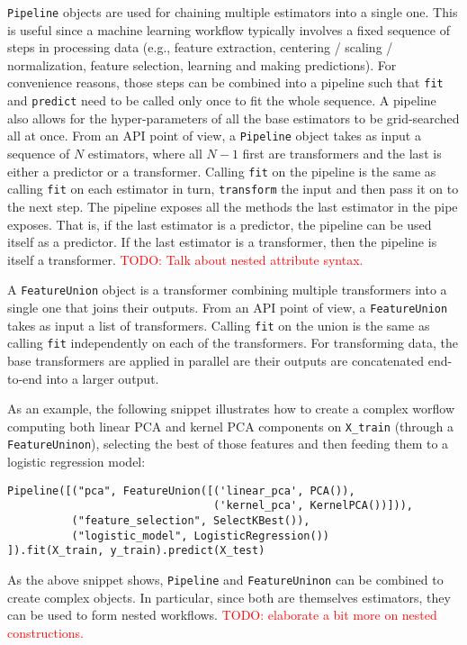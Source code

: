 \documentclass{llncs}
\begin{document}
\texttt{Pipeline} objects are used for chaining multiple estimators into a
single one. This is useful since a machine learning workflow typically involves
a fixed sequence of steps in processing data (e.g., feature extraction,
centering / scaling / normalization, feature selection, learning and making
predictions). For convenience reasons, those steps can be combined into a
pipeline such that \texttt{fit} and \texttt{predict} need to be called only once
to fit the whole sequence. A pipeline also allows for the hyper-parameters of
all the base estimators to be grid-searched all at once. From an API point of
view, a \texttt{Pipeline} object takes as input a sequence of $N$ estimators,
where all $N-1$ first are transformers and the last is either a predictor or a
transformer. Calling \texttt{fit} on the pipeline is the same as calling
\texttt{fit} on each estimator in turn, \texttt{transform} the input and then
pass it on to the next step. The pipeline exposes all the methods the last
estimator in the pipe exposes. That is, if the last estimator is a predictor,
the pipeline can be used itself as a predictor. If the last estimator is a
transformer, then the pipeline is itself a transformer. \textcolor{red}{TODO:
Talk about nested attribute syntax.}

A \texttt{FeatureUnion} object is a transformer combining multiple transformers
into a single one that joins their outputs. From an API point of view, a
\texttt{FeatureUnion} takes as input a list of transformers. Calling
\texttt{fit} on the union is the same as calling \texttt{fit} independently on
each of the transformers. For transforming data, the base transformers are
applied in parallel are their outputs are concatenated end-to-end into a larger
output.

As an example, the following snippet illustrates how to create a complex worflow
computing both linear PCA and kernel PCA components on \texttt{X\_train} (through a
\texttt{FeatureUninon}), selecting the best of those features and then feeding
them to a logistic regression model:
\begin{verbatim}
Pipeline([("pca", FeatureUnion([('linear_pca', PCA()),
                                ('kernel_pca', KernelPCA())])),
          ("feature_selection", SelectKBest()),
          ("logistic_model", LogisticRegression())
]).fit(X_train, y_train).predict(X_test)
\end{verbatim}

As the above snippet shows, \texttt{Pipeline} and \texttt{FeatureUninon} can be
combined to create complex objects. In particular, since both are themselves
estimators, they can be used to form nested workflows. \textcolor{red}{TODO:
elaborate a bit more on nested constructions.}
\end{document}
